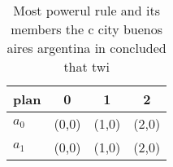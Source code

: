 \documentclass[a4paper]{article}
\begin{document}
\begin{table}
\begin{adjustbox}{width=0.5\columnwidth}
\begin{tabular}{|l|l|l|l|}
\hline
\textbf{plan} & \multicolumn{1}{c|}{\textbf{0}} & \multicolumn{1}{c|}{\textbf{1}} & \multicolumn{1}{c|}{\textbf{2}} \\ \hline
\textbf{$a_0$}  & (0,0) & (1,0) & (2,0) \\ \hline
\textbf{$a_1$}  & (0,0) & (1,0) & (2,0) \\ \hline
\end{tabular}
\end{adjustbox}
\caption{Most powerul rule and its members the c city buenos aires argentina in concluded that twi
}
\end{table}
\end{document}
